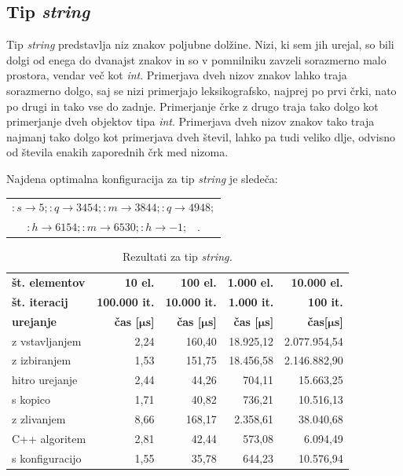 \documentclass[a4paper,oneside,12pt]{article}
\newcommand{\lra}{\ensuremath{\longrightarrow}}
\newcommand{\edot}{\;\;\;.}
\newcommand{\bmu}{\ensuremath{\boldsymbol{\mu}}}
\newcommand{\usec}{\ensuremath{\bmu}s}
\begin{document}
\pagebreak
\mbox{}

\pagebreak
\subsection{Tip \emph{string}}
\label{chapter:rez:string}
Tip \emph{string} predstavlja niz znakov poljubne dolžine. Nizi, ki sem jih urejal, so
bili dolgi od enega do dvanajst znakov in so v pomnilniku zavzeli sorazmerno malo prostora,
vendar več kot \emph{int}. Primerjava dveh nizov znakov lahko traja sorazmerno dolgo, saj se
nizi primerjajo leksikografsko, najprej po prvi črki, nato po drugi in tako vse do zadnje.
Primerjanje črke z drugo traja tako dolgo kot primerjanje dveh objektov tipa \emph{int}.
Primerjava dveh nizov znakov tako traja najmanj tako dolgo kot primerjava dveh števil, lahko
pa tudi veliko dlje, odvisno od števila enakih zaporednih črk med nizoma.

Najdena optimalna konfiguracija za tip \emph{string} je sledeča:
\vspace{-0.3ex}
\begin{center}
  \begin{tabular}[h!]{c} 
    $ :s \lra 5;:q \lra 3454;:m \lra 3844;:q \lra 4948; $ \\
    $ :h \lra 6154;:m \lra 6530;:h \lra -1; \edot $ \\
  \end{tabular}
\end{center}

\vspace{-1.0ex}
\begin{table}[h!]
  \centering
  \caption[Rezultati za tip \emph{string}]{Rezultati za tip \emph{string.}}
  \label{tab:rez:string} \vspace{1ex}
  \begin{tabular}{l!{\vrule width 1pt}r|r|r|r}
    \bf št. elementov     & \bf 10 el.& \bf 100 el.& \bf 1.000 el. & \bf 10.000 el. \\ 
    \bf št. iteracij      & \bf 100.000 it. & \bf 10.000 it. & \bf 1.000 it. & \bf 100 it. \\ \hline
    \bf urejanje          & \bf čas [\usec] & \bf čas [\usec] & \bf čas [\usec] & \bf čas[\usec] \\  
    z vstavljanjem        & 2,24 & 160,40 & 18.925,12 & 2.077.954,54 \\ \hline
    z izbiranjem          & 1,53 & 151,75 & 18.456,58 & 2.146.882,90 \\ \hline
    hitro urejanje        & 2,44 &  44,26 &    704,11 &    15.663,25 \\ \hline
    s kopico              & 1,71 &  40,82 &    736,21 &    10.516,13 \\ \hline
    z zlivanjem           & 8,66 & 168,17 &  2.358,61 &    38.040,68 \\ \hline
    C++ algoritem         & 2,81 &  42,44 &    573,08 &     6.094,49 \\ \hline
    s konfiguracijo       & 1,55 &  35,78 &    644,23 &    10.576,94 \\ 
  \end{tabular}
\end{table}
\end{document}
